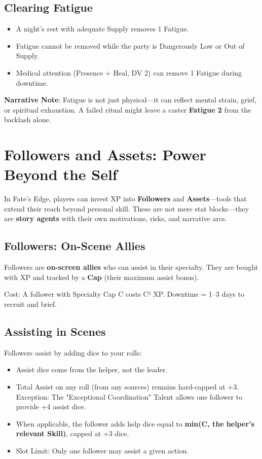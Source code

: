 \subsection*{Clearing Fatigue}

\begin{itemize}
    \item A night's rest with adequate Supply removes 1 Fatigue.
    \item Fatigue cannot be removed while the party is Dangerously Low or Out of Supply.
    \item Medical attention (Presence + Heal, DV 2) can remove 1 Fatigue during downtime.
\end{itemize}

\textbf{Narrative Note}: Fatigue is not just physical---it can reflect mental strain, grief, or spiritual exhaustion. A failed ritual might leave a caster \textbf{Fatigue 2} from the backlash alone.

\section*{Followers and Assets: Power Beyond the Self}

In Fate's Edge, players can invest XP into \textbf{Followers} and \textbf{Assets}---tools that extend their reach beyond personal skill. These are not mere stat blocks---they are \textbf{story agents} with their own motivations, risks, and narrative arcs.

\subsection*{Followers: On-Scene Allies}

Followers are \textbf{on-screen allies} who can assist in their specialty. They are bought with XP and tracked by a \textbf{Cap} (their maximum assist bonus).

Cost: A follower with Specialty Cap C costs C² XP. Downtime = 1--3 days to recruit and brief.

\subsection*{Assisting in Scenes}

Followers assist by adding dice to your rolls:

\begin{itemize}
    \item Assist dice come from the helper, not the leader.
    \item Total Assist on any roll (from any sources) remains hard-capped at +3. Exception: The "Exceptional Coordination" Talent allows one follower to provide +4 assist dice.
    \item When applicable, the follower adds help dice equal to \textbf{min(C, the helper's relevant Skill)}, capped at +3 dice.
    \item Slot Limit: Only one follower may assist a given action.
\end{itemize}

